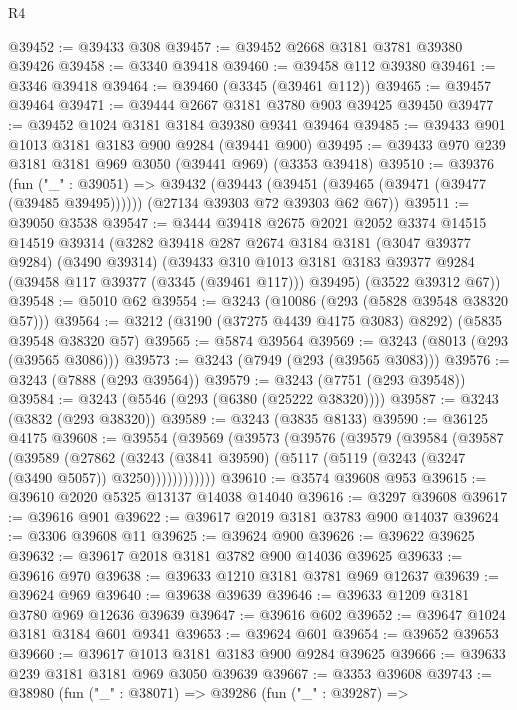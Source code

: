 \begin{lexlean}{R4}
\begin{coremodule}
@39452 := @39433 @308
@39457 := @39452 @2668 @3181 @3781 @39380 @39426
@39458 := @3340 @39418
@39460 := @39458 @112 @39380
@39461 := @3346 @39418
@39464 := @39460 (@3345 (@39461 @112))
@39465 := @39457 @39464
@39471 := @39444 @2667 @3181 @3780 @903 @39425 @39450
@39477 := @39452 @1024 @3181 @3184 @39380 @9341 @39464
@39485 := @39433 @901 @1013 @3181 @3183 @900 @9284 (@39441 @900)
@39495 := @39433 @970 @239 @3181 @3181 @969 @3050 (@39441 @969) (@3353 @39418)
@39510 := @39376
    (fun ("_" : @39051) =>
    @39432
      (@39443 (@39451 (@39465 (@39471 (@39477 (@39485 @39495))))))
      (@27134 @39303 @72 @39303 @62 @67))
@39511 := @39050 @3538
@39547 := @3444
    @39418
    @2675
    @2021
    @2052
    @3374
    @14515
    @14519
    @39314
    (@3282
      @39418
      @287
      @2674
      @3184
      @3181
      (@3047 @39377 @9284)
      (@3490 @39314)
      (@39433 @310 @1013 @3181 @3183 @39377 @9284 (@39458 @117 @39377 (@3345 (@39461 @117))) @39495)
      (@3522 @39312 @67))
@39548 := @5010 @62
@39554 := @3243 (@10086 (@293 (@5828 @39548 @38320 @57)))
@39564 := @3212 (@3190 (@37275 @4439 @4175 @3083) @8292) (@5835 @39548 @38320 @57)
@39565 := @5874 @39564
@39569 := @3243 (@8013 (@293 (@39565 @3086)))
@39573 := @3243 (@7949 (@293 (@39565 @3083)))
@39576 := @3243 (@7888 (@293 @39564))
@39579 := @3243 (@7751 (@293 @39548))
@39584 := @3243 (@5546 (@293 (@6380 (@25222 @38320))))
@39587 := @3243 (@3832 (@293 @38320))
@39589 := @3243 (@3835 @8133)
@39590 := @36125 @4175
@39608 := @39554
    (@39569
      (@39573
        (@39576
          (@39579
            (@39584
              (@39587
                (@39589
                  (@27862
                    (@3243
                      (@3841 @39590)
                      (@5117 (@5119 (@3243 (@3247 (@3490 @5057)) @3250))))))))))))
@39610 := @3574 @39608 @953
@39615 := @39610 @2020 @5325 @13137 @14038 @14040
@39616 := @3297 @39608
@39617 := @39616 @901
@39622 := @39617 @2019 @3181 @3783 @900 @14037
@39624 := @3306 @39608 @11
@39625 := @39624 @900
@39626 := @39622 @39625
@39632 := @39617 @2018 @3181 @3782 @900 @14036 @39625
@39633 := @39616 @970
@39638 := @39633 @1210 @3181 @3781 @969 @12637
@39639 := @39624 @969
@39640 := @39638 @39639
@39646 := @39633 @1209 @3181 @3780 @969 @12636 @39639
@39647 := @39616 @602
@39652 := @39647 @1024 @3181 @3184 @601 @9341
@39653 := @39624 @601
@39654 := @39652 @39653
@39660 := @39617 @1013 @3181 @3183 @900 @9284 @39625
@39666 := @39633 @239 @3181 @3181 @969 @3050 @39639
@39667 := @3353 @39608
@39743 := @38980
    (fun ("_" : @38071) =>
    @39286
      (fun ("_" : @39287) =>

\end{coremodule}
\end{lexlean}
